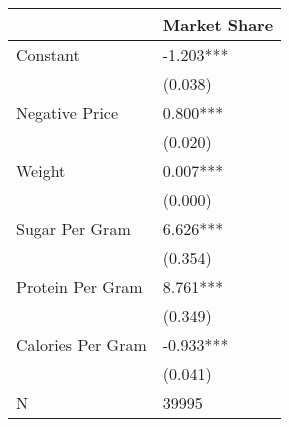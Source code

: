 \begin{tabular}{ll}
\hline
                    & Market Share  \\
\hline
Constant               & -1.203***     \\
                    & (0.038)       \\
Negative Price            & 0.800***      \\
                    & (0.020)       \\
Weight              & 0.007***      \\
                    & (0.000)       \\
Sugar Per Gram    & 6.626***      \\
                    & (0.354)       \\
Protein Per Gram  & 8.761***      \\
                    & (0.349)       \\
Calories Per Gram & -0.933***     \\
                    & (0.041)       \\
N                   & 39995         \\
\hline
\end{tabular}